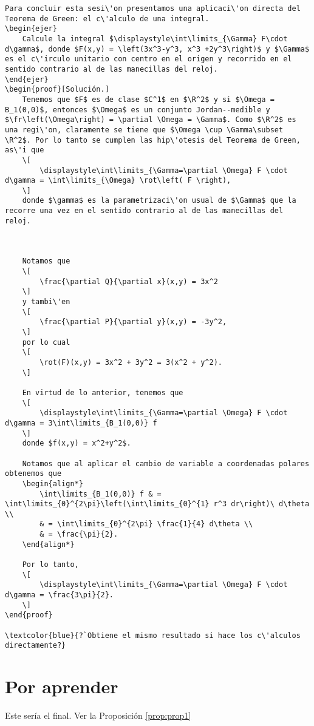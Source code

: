 \documentclass[
]{krantz}
\newtheorem{ejer}[teo]{Ejercicio}
\theoremstyle{definition}
\newcommand{\R}{\mathbb{R}}  %
\DeclareMathOperator{\fr}{Fr}
\DeclareMathOperator{\rot}{Rot}
\theoremstyle{definition}
\theoremstyle{definition}
\theoremstyle{definition}
\theoremstyle{remark}
\begin{document}
\begin{verbatim}
Para concluir esta sesi\'on presentamos una aplicaci\'on directa del Teorema de Green: el c\'alculo de una integral.
\begin{ejer}
    Calcule la integral $\displaystyle\int\limits_{\Gamma} F\cdot d\gamma$, donde $F(x,y) = \left(3x^3-y^3, x^3 +2y^3\right)$ y $\Gamma$ es el c\'irculo unitario con centro en el origen y recorrido en el sentido contrario al de las manecillas del reloj.
\end{ejer}
\begin{proof}[Solución.]
    Tenemos que $F$ es de clase $C^1$ en $\R^2$ y si $\Omega = B_1(0,0)$, entonces $\Omega$ es un conjunto Jordan--medible y $\fr\left(\Omega\right) = \partial \Omega = \Gamma$. Como $\R^2$ es una regi\'on, claramente se tiene que $\Omega \cup \Gamma\subset \R^2$. Por lo tanto se cumplen las hip\'otesis del Teorema de Green, as\'i que
    \[
        \displaystyle\int\limits_{\Gamma=\partial \Omega} F \cdot d\gamma = \int\limits_{\Omega} \rot\left( F \right), 
    \]
    donde $\gamma$ es la parametrizaci\'on usual de $\Gamma$ que la recorre una vez en el sentido contrario al de las manecillas del reloj.
    
    
    
    Notamos que
    \[
        \frac{\partial Q}{\partial x}(x,y) = 3x^2
    \]
    y tambi\'en
    \[
        \frac{\partial P}{\partial y}(x,y) = -3y^2,
    \]
    por lo cual
    \[
        \rot(F)(x,y) = 3x^2 + 3y^2 = 3(x^2 + y^2). 
    \]
    
    En virtud de lo anterior, tenemos que
    \[
        \displaystyle\int\limits_{\Gamma=\partial \Omega} F \cdot d\gamma = 3\int\limits_{B_1(0,0)} f
    \]
    donde $f(x,y) = x^2+y^2$.
    
    Notamos que al aplicar el cambio de variable a coordenadas polares obtenemos que
    \begin{align*}
        \int\limits_{B_1(0,0)} f & = \int\limits_{0}^{2\pi}\left(\int\limits_{0}^{1} r^3 dr\right)\ d\theta \\
        & = \int\limits_{0}^{2\pi} \frac{1}{4} d\theta \\
        & = \frac{\pi}{2}.
    \end{align*}

    Por lo tanto,
    \[
        \displaystyle\int\limits_{\Gamma=\partial \Omega} F \cdot d\gamma = \frac{3\pi}{2}.
    \]
\end{proof}

\textcolor{blue}{?`Obtiene el mismo resultado si hace los c\'alculos directamente?}
\end{verbatim}

\cleardoublepage

\hypertarget{appendix-apuxe9ndice-de-prueba}{%
\appendix {}}


\hypertarget{por-aprender}{%
\chapter{Por aprender}\label{por-aprender}}

Este sería el final. Ver la Proposición \ref{prop:prop1}

  

\backmatter
\printindex
\end{document}
